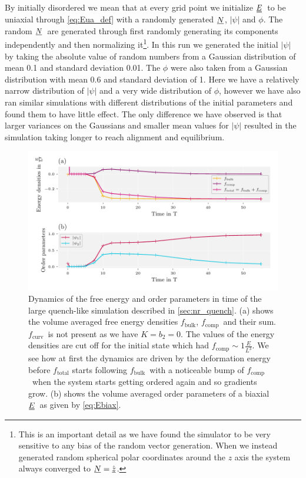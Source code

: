\documentclass[12pt]{article}
\newcommand{\suf}[2]{\stackunder[0.5pt]{\stackunder[1pt]{\ensuremath{#1}}{\rule{\widthof{\ensuremath{#2}}*\real{0.9}}{.1ex}}}{}}
\newcommand{\duf}[2]{\stackunder[0.5pt]{\stackunder[0.8pt]{\stackunder[1pt]{\ensuremath{#1}}{\rule{\widthof{\ensuremath{#2}}*\real{0.9}}{.1ex}}}{\rule{\widthof{\ensuremath{#2}}*\real{0.9}}{.1ex}}}{}}
\newcommand{\su}[1]{\suf{#1}{#1}}
\newcommand{\du}[1]{\duf{#1}{#1}}
\newcommand{\NN}{\ensuremath{\su{N}}}
\newcommand{\EE}{\ensuremath{\du{E}}}
\newcommand{\FB}{\ensuremath{f_\text{bulk}}}
\newcommand{\FC}{\ensuremath{f_\text{comp}}}
\newcommand{\FU}{\ensuremath{f_\text{curv}}}
\begin{document}
        By initially disordered we mean that at every grid point we initialize \EE\ to be uniaxial through \cref{eq:Eua_def} with a randomly generated \NN, $|\psi|$ and $\phi$.
        The random \NN\ are generated through first randomly generating its components independently and then normalizing it\footnote{This is an important detail as we have found the simulator to be very sensitive to any bias of the random vector generation. When we instead generated random spherical polar coordinates around the $z$ axis the system always converged to $\NN = \hat{\su{z}}$.}.
        In this run we generated the initial $|\psi|$ by taking the absolute value of random numbers from a Gaussian distribution of mean 0.1 and standard deviation 0.01.
        The $\phi$ were also taken from a Gaussian distribution with mean 0.6 and standard deviation of 1.
        Here we have a relatively narrow distribution of $|\psi|$ and a very wide distribution of $\phi$, however we have also ran similar simulations with different distributions of the initial parameters and found them to have little effect.
        The only difference we have observed is that larger variances on the Gaussians and smaller mean values for $|\psi|$ resulted in the simulation taking longer to reach alignment and equilibrium.

        \begin{figure}[t!]
            \begin{center}
                \includegraphics{figures/data_plots/fiso_r7_energies.pdf}
            \end{center}
            \caption{
                Dynamics of the free energy and order parameters in time of the large quench-like simulation described in \cref{sec:nr_quench}.
                (a) shows the volume averaged free energy densities \FB, \FC\ and their sum. \FU\ is not present as we have $K=b_2=0$.
                The values of the energy densities are cut off for the initial state which had $\FC\sim1\si{\frac{E}{L^3}}$.
                We see how at first the dynamics are driven by the deformation energy before $f_\text{total}$ starts following \FB\ with a noticeable bump of \FC\ when the system starts getting ordered again and so gradients grow.
                (b) shows the volume averaged order parameters of a biaxial \EE\ as given by \cref{eq:Ebiax}.
            }\label{fig:fiso_r7e}
        \end{figure}
\end{document}
